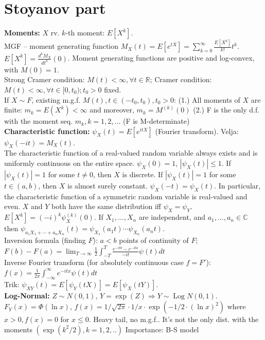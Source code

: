 \documentclass[a4paper, oneside, 12pt]{article}
\theoremstyle{definition}
\def\C{\mathbb{C}}
\begin{document}
\section*{Stoyanov part}
\textbf{Moments:} $X$ rv. $k$-th moment: $E[X^k]$. \\
MGF -- moment generating function $M_X(t) = E[e^{tX}] = \sum_{k=0}^\infty \frac{E[X^k]}{k!} t^k$. \\
$E[X^k] = \frac{d^k M_X}{dt^k}(0)$.
Moment generating functions are positive and log-convex, with $M(0) = 1$. \\
Strong Cramer condition: $M(t)<\infty, \forall t \in \mathbb{R}$;
Cramer condition: $M(t)<\infty, \forall t \in [0,t_0); t_0 > 0$ fixed.\\
If $X \sim F$, existing m.g.f. $M(t), t \in (-t_0, t_0), t_0 > 0$: (1.) All moments of $X$ are finite: $m_k = E(X^k) < \infty$ and moreover, $m_k =M^{(k)}(0)$ (2.) F is the only d.f. with the moment seq. ${m_k, k = 1,2, \dots}$ (F is M-determinate)\\
\textbf{Characteristic function:} $\psi_X(t) = E[e^{itX}]$ (Fourier transform).
Velja: $\psi_X(-it) = M_X(t)$. \\
The characteristic function of a real-valued random variable always exists and
is uniformly continuous on the entire space. $\psi_X(0) = 1$, $|\psi_X(t)| \leq 1$.
If $|\psi_X(t)| = 1$ for some $t \neq 0$, then $X$ is discrete.
If $|\psi_X(t)| = 1$ for some $t \in (a, b)$, then $X$ is almost surely constant.
$\psi_X(-t) = \psi_X(t)$. In particular, the characteristic function of a symmetric
random variable is real-valued and even.
$X$ and $Y$ both have the same distribution iff $\psi_{X}=\psi_{Y}$.
$E[X^k] = (-i)^k \psi_X^{(k)}(0)$.
If $X_1, \ldots, X_n$ are independent, and $a_1,\ldots, a_n \in \C$
then $\psi_{a_1X_1+\cdots+a_nX_n}(t) = \psi_{X_1}(a_1t)\cdots \psi_{X_n}(a_nt)$. \\
Inversion formula (finding $F$): $a<b$ points of continuity of $F$; $F(b)-F(a) = \lim_{T\rightarrow \infty}\frac{1}{2}\int_{-T}^{T}\frac{e^{-itb}-e^{-ita}}{-it}\psi(t)dt$\\
Inverse Fourier transform (for absolutely continuous case $f=F'$): $f(x) = \frac{1}{2 \pi}\int_{-\infty}^{\infty} e^{-itx}\psi(t)dt$\\
Trik: $\psi_{XY}(t) = E[\psi_Y(tX)] = E[\psi_X(tY)]$.\\
\textbf{Log-Normal:}
$Z \sim N(0,1)$, $Y = \exp(Z) \Rightarrow Y \sim \operatorname{Log}N(0,1)$. $F_Y(x) = \Phi (\ln x)$, $f(x) = 1/\sqrt{2\pi}\cdot 1/x\cdot \exp(-1/2\cdot(\ln x)^2)$ where $x > 0, f(x) = 0$ for $x \leq 0$. Heavy tail, no m.g.f.. It's not the only dist. with the moments $(\exp(k^2/2), k=1,2,..)$ Importance: B-S model\\
\end{document}
